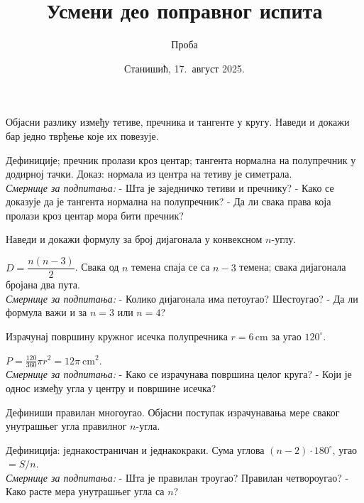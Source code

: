 \documentclass[11pt,a5paper,twoside,addpoints,answers]{exam}
\title{Усмени део поправног испита}
\author{Проба}
\date{Станишић, 17.~август 2025.}
\newcommand{\measure}[2]{#1\,\mathrm{#2}}
\begin{document}
\maketitle

\begin{questions}

\question Објасни разлику између тетиве, пречника и тангенте у кругу. Наведи и докажи бар једно тврђење које их повезује.
\begin{solution}
Дефиниције; пречник пролази кроз центар; тангента нормална на полупречник у додирној тачки. Доказ: нормала из центра на тетиву је симетрала.
\\[0.5em]
\textit{Смернице за подпитања:}  
- Шта је заједничко тетиви и пречнику?  
- Како се доказује да је тангента нормална на полупречник?  
- Да ли свака права која пролази кроз центар мора бити пречник?  
\end{solution}

\question Наведи и докажи формулу за број дијагонала у конвексном $n$-углу.
\begin{solution}
$D=\dfrac{n(n-3)}2$. Свака од $n$ темена спаја се са $n-3$ темена; свака дијагонала бројана два пута.  
\\[0.5em]
\textit{Смернице за подпитања:}  
- Колико дијагонала има петоугао? Шестоугао?  
- Да ли формула важи и за $n=3$ или $n=4$?  
\end{solution}

\question Израчунај површину кружног исечка полупречника $r=\measure{6}{cm}$ за угао $120^\circ$.
\begin{solution}
$P=\tfrac{120}{360}\pi r^2=12\pi\ \mathrm{cm}^2$.  
\\[0.5em]
\textit{Смернице за подпитања:}  
- Како се израчунава површина целог круга?  
- Који је однос између угла у центру и површине исечка?  
\end{solution}

\question Дефиниши правилан многоугао. Објасни поступак израчунавања мере сваког унутрашњег угла правилног $n$-угла.
\begin{solution}
Дефиниција: једнакостраничан и једнакокраки. Сума углова $(n-2)\cdot180^\circ$, угао $=S/n$.  
\\[0.5em]
\textit{Смернице за подпитања:}  
- Шта је правилан троугао? Правилан четвороугао?  
- Како расте мера унутрашњег угла са $n$?  
\end{solution}


\end{questions}
\end{document}

